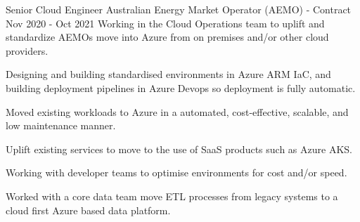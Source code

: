 \begin{cventries}
  \cventryextended
  {Senior Cloud Engineer} %
  {Australian Energy Market Operator (AEMO) - Contract}
  {} %
  {Nov 2020 - Oct 2021} %
  {Working in the Cloud Operations team to uplift and standardize AEMOs move
    into
    Azure from on premises and/or other cloud providers.}
  {
    \begin{cvitems} %
      \item {Designing and building standardised environments in Azure ARM IaC,
                  and building deployment pipelines in Azure Devops so
                  deployment is fully
                  automatic.}
      \item {Moved existing workloads to Azure in a automated, cost-effective,
                  scalable, and low maintenance manner.}
      \item {Uplift existing services to move to the use of SaaS products such
                  as
                  Azure AKS.}
      \item {Working with developer teams to optimise environments for cost
                  and/or speed.}
      \item {Worked with a core data team move ETL processes from legacy
                  systems
                  to a cloud first Azure based data platform.}
    \end{cvitems}
  }


\end{cventries}
